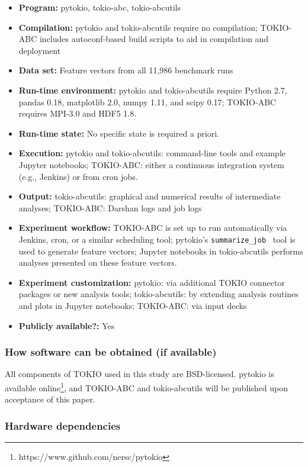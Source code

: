 {\small
\begin{itemize}
  \item {\bf Program: } pytokio, tokio-abc, tokio-abcutils
  \item {\bf Compilation: } pytokio and tokio-abcutils require no compilation; TOKIO-ABC includes autoconf-based build scripts to aid in compilation and deployment
  \item {\bf Data set: } Feature vectors from all 11,986 benchmark runs
  \item {\bf Run-time environment: } pytokio and tokio-abcutils require Python 2.7, pandas 0.18, matplotlib 2.0, numpy 1.11, and scipy 0.17; TOKIO-ABC requires MPI-3.0 and HDF5 1.8.
  \item {\bf Run-time state: } No specific state is required a priori.
  \item {\bf Execution: } pytokio and tokio-abcutils: command-line tools and example Jupyter notebooks; TOKIO-ABC: either a continuous integration system (e.g., Jenkins) or from cron jobs.
  \item {\bf Output: } tokio-abcutils: graphical and numerical results of intermediate analyses; TOKIO-ABC: Darshan logs and job logs
  \item {\bf Experiment workflow: } TOKIO-ABC is set up to run automatically via Jenkins, cron, or a similar scheduling tool; pytokio's \texttt{summarize\_job}~\cite{Lockwood2018tokio} tool is used to generate feature vectors; Jupyter notebooks in tokio-abcutils performs analyses presented on these feature vectors.
  \item {\bf Experiment customization: } pytokio: via additional TOKIO connector packages or new analysis tools; tokio-abcutils: by extending analysis routines and plots in Jupyter notebooks; TOKIO-ABC: via input decks
  \item {\bf Publicly available?: } Yes
\end{itemize}
}

\subsubsection{How software can be obtained (if available)}

All components of TOKIO used in this study are BSD-licensed.
pytokio is available online\footnote{https://www.github.com/nersc/pytokio}, and TOKIO-ABC and tokio-abcutils will be published upon acceptance of this paper.

\subsubsection{Hardware dependencies}

